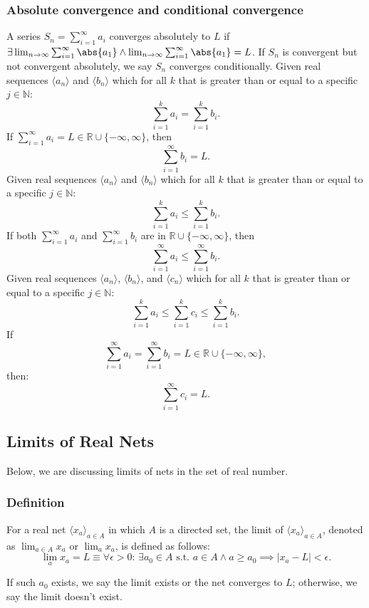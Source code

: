 \documentclass[a4paper,12pt]{report}
\begin{document}
\subsubsection{Absolute convergence and conditional convergence}
A series $S_n=\sum_{i=1}^{\infty}a_i$ converges absolutely to $L$ if $\exists\lim_{n\to\infty}\sum_{i=1}^{\infty}\abs{a_1}\land\lim_{n\to\infty}\sum_{i=1}^{\infty}\abs{a_1}=L$. If $S_n$ is convergent but not convergent absolutely, we say $S_n$ converges conditionally.
Given real sequences $\langle a_n\rangle$ and $\langle b_n\rangle$ which for all $k$ that is greater than or equal to a specific $j\in \mathbb{N}$:
\[\sum_{i=1}^ka_i=\sum_{i=1}^kb_i.\]
If $\sum_{i=1}^{\infty}a_i=L\in\mathbb{R}\cup\{-\infty,\infty\}$, then
\[\sum_{i=1}^{\infty}b_i=L.\]
Given real sequences $\langle a_n\rangle$ and $\langle b_n\rangle$ which for all $k$ that is greater than or equal to a specific $j\in \mathbb{N}$:
\[\sum_{i=1}^ka_i\leq\sum_{i=1}^kb_i.\]
If both $\sum_{i=1}^{\infty}a_i$ and $\sum_{i=1}^{\infty}b_i$ are in $\mathbb{R}\cup\{-\infty,\infty\}$, then
\[\sum_{i=1}^{\infty}a_i\leq\sum_{i=1}^{\infty}b_i.\]
Given real sequences $\langle a_n\rangle$, $\langle b_n\rangle$, and $\langle c_n\rangle$ which for all $k$ that is greater than or equal to a specific $j\in \mathbb{N}$:
\[\sum_{i=1}^ka_i\leq\sum_{i=1}^kc_i\leq\sum_{i=1}^kb_i.\]
If
\[\sum_{i=1}^{\infty}a_i=\sum_{i=1}^{\infty}b_i=L\in\mathbb{R}\cup\{-\infty,\infty\},\]
then: 
\[\sum_{i=1}^{\infty}c_i=L.\]
\subsection{Limits of Real Nets}
Below, we are discussing limits of nets in the set of real number.
\subsubsection{Definition}
For a real net $\langle x_a\rangle_{a\in A}$ in which $A$ is a directed set, the limit of $\langle x_a\rangle_{a\in A}$, denoted as $\lim_{a\in A} x_a$ or $\lim_a x_a$, is defined as follows:
\[\lim_ax_a = L \equiv \forall \epsilon > 0:\, \exists a_0 \in A\text{\ s.t.\ } a\in A\land a\ge a_0\implies |x_a - L| < \epsilon.\]

If such $a_0$ exists, we say the limit exists or the net converges to $L$; otherwise, we say the limit doesn't exist.
\end{document}

